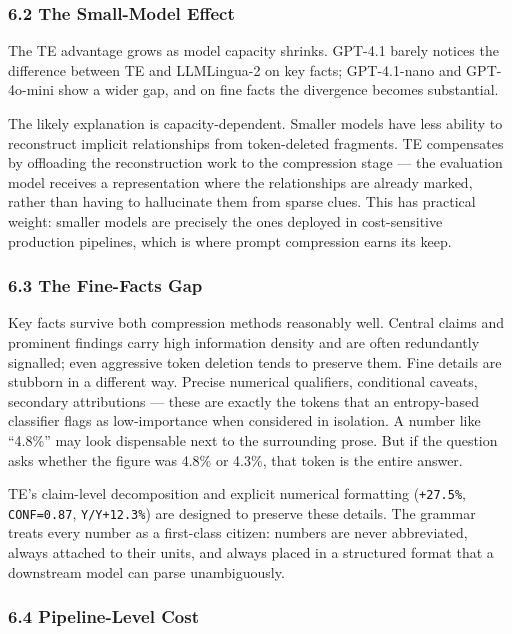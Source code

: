 \documentclass[
]{article}
\begin{document}
\subsubsection{6.2 The Small-Model Effect}\label{the-small-model-effect}

The TE advantage grows as model capacity shrinks. GPT-4.1 barely notices
the difference between TE and LLMLingua-2 on key facts; GPT-4.1-nano and
GPT-4o-mini show a wider gap, and on fine facts the divergence becomes
substantial.

The likely explanation is capacity-dependent. Smaller models have less
ability to reconstruct implicit relationships from token-deleted
fragments. TE compensates by offloading the reconstruction work to the
compression stage --- the evaluation model receives a representation
where the relationships are already marked, rather than having to
hallucinate them from sparse clues. This has practical weight: smaller
models are precisely the ones deployed in cost-sensitive production
pipelines, which is where prompt compression earns its keep.

\subsubsection{6.3 The Fine-Facts Gap}\label{the-fine-facts-gap}

Key facts survive both compression methods reasonably well. Central
claims and prominent findings carry high information density and are
often redundantly signalled; even aggressive token deletion tends to
preserve them. Fine details are stubborn in a different way. Precise
numerical qualifiers, conditional caveats, secondary attributions ---
these are exactly the tokens that an entropy-based classifier flags as
low-importance when considered in isolation. A number like ``4.8\%'' may
look dispensable next to the surrounding prose. But if the question asks
whether the figure was 4.8\% or 4.3\%, that token is the entire answer.

TE's claim-level decomposition and explicit numerical formatting
(\texttt{+27.5\%}, \texttt{CONF=0.87}, \texttt{Y/Y+12.3\%}) are designed
to preserve these details. The grammar treats every number as a
first-class citizen: numbers are never abbreviated, always attached to
their units, and always placed in a structured format that a downstream
model can parse unambiguously.

\subsubsection{6.4 Pipeline-Level Cost}\label{pipeline-level-cost}
\end{document}
